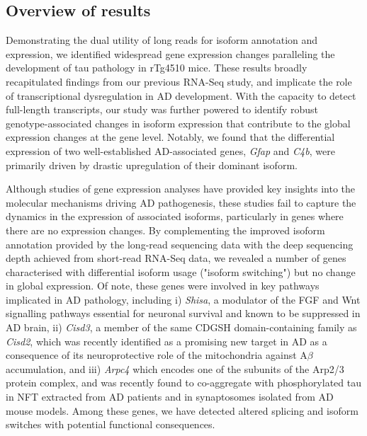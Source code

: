 \subsection{Overview of results}
Demonstrating the dual utility of long reads for isoform annotation and expression, we identified widespread gene expression changes paralleling the development of tau pathology in rTg4510 mice. These results broadly recapitulated findings from our previous RNA-Seq study\cite{Castanho2020}, and implicate the role of transcriptional dysregulation in AD development. With the capacity to detect full-length transcripts, our study was further powered to identify robust genotype-associated changes in isoform expression that contribute to the global expression changes at the gene level. Notably, we found that the differential expression of two well-established AD-associated genes, \textit{Gfap} and \textit{C4b}, were primarily driven by drastic upregulation of their dominant isoform. 

Although studies of gene expression analyses have provided key insights into the molecular mechanisms driving AD pathogenesis\cite{Castanho2020,Salih2019,Annese2018,Magistri2015}, these studies fail to capture the dynamics in the expression of associated isoforms, particularly in genes where there are no expression changes. By complementing the improved isoform annotation provided by the long-read sequencing data with the deep sequencing depth achieved from short-read RNA-Seq data, we revealed a number of genes characterised with differential isoform usage ("isoform switching") but no change in global expression. Of note, these genes were involved in key pathways implicated in AD pathology, including i) \textit{Shisa}, a modulator of the FGF and Wnt signalling pathways essential for neuronal survival and known to be suppressed in AD brain\cite{Jia2019}, ii) \textit{Cisd3}, a member of the same CDGSH domain-containing family as \textit{Cisd2}, which was recently identified as a promising new target in AD as a consequence of its neuroprotective role of the mitochondria against A$\beta$ accumulation\cite{Chen2020}, and iii) \textit{Arpc4} which encodes one of the subunits of the Arp2/3 protein complex, and was recently found to co-aggregate with phosphorylated tau in NFT extracted from AD patients\cite{Drummond2020} and in synaptosomes isolated from AD mouse models\cite{Li2020a}. Among these genes, we have detected altered splicing and isoform switches with potential functional consequences.  
  
